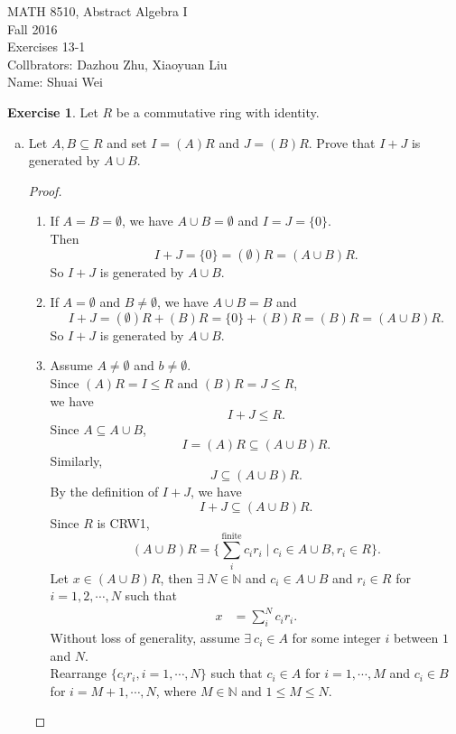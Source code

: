 \documentclass{article}
\newcommand{\bbn}{\mathbb{N}}
\theoremstyle{plain}
\theoremstyle{definition}
\newtheorem{exer}[lem]{Exercise}
\begin{document}
\noindent MATH 8510, Abstract Algebra I \\
Fall 2016\\
Exercises 13-1\\
Collbrators: Dazhou Zhu, Xiaoyuan Liu\\
Name: Shuai Wei



\begin{exer}
Let $R$ be a commutative ring with identity.
\begin{enumerate}[(a)]
\item 
Let $A,B\subseteq R$ and set $I=(A)R$ and $J=(B)R$. 
Prove that $I+J$ is generated by $A\cup B$.
\begin{proof}
    \begin{enumerate}[(1)]
    \item
        If $A = B=\emptyset$, we have $A\cup B = \emptyset$ and $I=J = \{0\}$.\\
        Then
        \[I+J = \{0\} = (\emptyset)R = (A\cup B)R. \]
        So $I+J$ is generated by $A\cup B$.
    \item 
        If $A= \emptyset$ and $B \neq \emptyset$, we have $A\cup B = B$ and 
            \[I+J = (\emptyset)R + (B)R = \{0\}+(B)R = (B)R =(A\cup B)R. \]
        So $I+J$ is generated by $A\cup B$.
    \item
        Assume $A \neq \emptyset$ and $b \neq \emptyset$.\\
        Since $(A)R = I \leq R$ and $(B)R = J \leq R$,\\
    we have 
    \[I + J \leq R.\]
    Since $A \subseteq A\cup B$, 
    \[I=(A)R \subseteq (A\cup B)R.\]
    Similarly, 
    \[J \subseteq (A\cup B)R.\]
    By the definition of $I+J$, we have
    \begin{equation}\label{eq1}
    I+J \subseteq (A\cup B)R.
    \end{equation}
    Since $R$ is CRW1,
    \[(A\cup B)R = \{\sum_{i}^{\text{finite}}c_ir_i\mid c_i \in A\cup B, r_i \in R\}.\]
    Let $x \in (A\cup B)R$, then $\exists \ N \in \bbn$ and $c_i \in A\cup B$ and $r_i \in R$ for $i = 1,2,\cdots,N$ such that 
    \begin{align*}
      x  &= \sum_{i}^{N} c_ir_i.
    \end{align*}
     Without loss of generality, assume $\exists \ c_i \in A$ for some integer $i$ between $1$ and $N$.\\
    Rearrange $\{c_ir_i,i=1,\cdots,N\}$ such that $c_i \in A$ for $i = 1,\cdots,M$ and $c_i \in B$ for $i = M+1,\cdots,N$, where $M \in \bbn$ and $1\leq M \leq N$.\\

\end{enumerate}
\end{proof}
\end{enumerate}
\end{exer}
\end{document}

